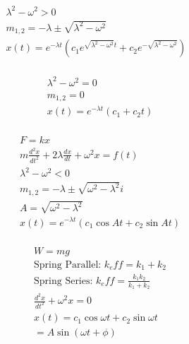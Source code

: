 \documentclass[12pt]{article}
\begin{document}
\begin{multicols}{2}

  \begin{equation*}
    \begin{split}
      \lambda^2-\omega^2>0&\\
      m_{1,2}=-\lambda \pm\sqrt{\lambda^2-\omega^2}\\
      x(t)=e^{-\lambda t}\left(c_1e^{\sqrt{\lambda^2-\omega^2}t}+c_2e^{-\sqrt{\lambda^2-\omega^2}} \right)\\
    \end{split}
    \label{5}
  \end{equation*}

  \begin{equation*}
    \begin{split}
     \lambda^2-\omega^2=0\\
      m_{1,2}=0\\
      x(t)=e^{-\lambda t}(c_1+c_2t)\\
    \end{split}
    \label{6}
  \end{equation*}

\end{multicols}

\begin{multicols}{2}

  \begin{equation*}
    \begin{split}
      F=kx\\
      m\frac{d^2x}{dt^2}+2\lambda\frac{dx}{dt}+\omega^2x=f(t)\\
      \lambda^2-\omega^2<0\\
      m_{1,2}=-\lambda \pm\sqrt{\omega^2-\lambda^2}i\\
      A=\sqrt{\omega^2-\lambda^2}\\
      x(t)=e^{-\lambda t}\left(c_1\cos At+c_2\sin At\right)\\
    \end{split}
    \label{7}
  \end{equation*}

  \begin{equation*}
    \begin{split}
      W=mg\\
      \text{Spring Parallel: } k_eff=k_1+k_2\\
      \text{Spring Series: } k_eff=\frac{k_1k_2}{k_1+k_2}\\
    \frac{d^2x}{dt^2}+\omega^2x=0\\
    x(t)=c_1\cos\omega t+ c_2\sin\omega t\\
    =A\sin(\omega t+\phi)
    \end{split}
    \label{8}
  \end{equation*}


\end{multicols}
\end{document}
